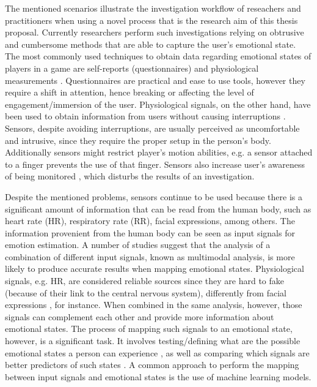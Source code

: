 The mentioned scenarios illustrate the investigation workflow of reseachers and practitioners when using a novel process that is the research aim of this thesis proposal. Currently researchers perform such investigations relying on obtrusive and cumbersome methods that are able to capture the user's emotional state. The most commonly used techniques to obtain data regarding emotional states of players in a game are self-reports (questionnaires) and physiological measurements \parencite{mekler2014systematic}. Questionnaires are practical and ease to use tools, however they require a shift in attention, hence breaking or affecting the level of engagement/immersion of the user. Physiological signals, on the other hand, have been used to obtain information from users without causing interruptions \parencite{bousefsaf2013remote,yun2009game,rani2006empirical,tijs2008dynamic}. Sensors, despite avoiding interruptions, are usually perceived as uncomfortable and intrusive, since they require the proper setup in the person's body. Additionally sensors might restrict player's motion abilities, e.g. a sensor attached to a finger prevents the use of that finger. Sensors also increase user's awareness of being monitored \parencite{yamakoshi2007preliminary,yamaguchi2006evaluation,healey2005detecting}, which disturbs the results of an investigation.


Despite the mentioned problems, sensors continue to be used because there is a significant amount of information that can be read from the human body, such as heart rate (HR), respiratory rate (RR), facial expressions, among others. The information provenient from the human body can be seen as input signals for emotion estimation. A number of studies \parencite{kukolja2014comparative} suggest that the analysis of a combination of different input signals, known as multimodal analysis, is more likely to produce accurate results when mapping emotional states. Physiological signals, e.g. HR, are considered reliable sources since they are hard to fake (because of their link to the central nervous system), differently from facial expressions \parencite{Landowska}, for instance. When combined in the same analysis, however, those signals can complement each other and provide more information about emotional states. The process of mapping such signals to an emotional state, however, is a significant task. It involves testing/defining what are the possible emotional states a person can experience \parencite{mandryk2006continuous}, as well as comparing which signals are better predictors of such states \parencite{jerritta2011physiological}. A common approach to perform the mapping between input signals and emotional states is the use of machine learning models.

